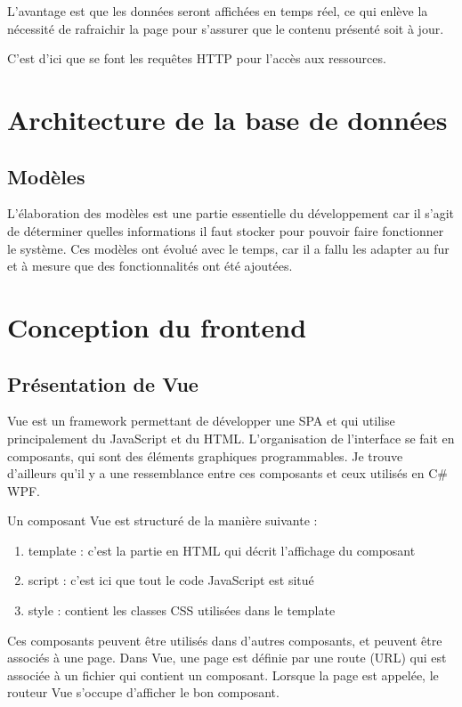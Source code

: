 \documentclass[
    iai, %
    eai, %
]{heig-tb}
\begin{document}
L'avantage est que les données seront affichées en temps réel, ce qui enlève la nécessité de rafraichir la page pour s'assurer que le contenu présenté soit à jour.

C'est d'ici que se font les requêtes HTTP pour l'accès aux ressources.

\chapter{Architecture de la base de données}
\section{Modèles}
L'élaboration des modèles est une partie essentielle du développement car il s'agit de déterminer quelles informations il faut stocker pour pouvoir faire fonctionner le système.
Ces modèles ont évolué avec le temps, car il a fallu les adapter au fur et à mesure que des fonctionnalités ont été ajoutées.

\chapter{Conception du frontend}

\section{Présentation de Vue}
Vue est un framework permettant de développer une SPA et qui utilise principalement du JavaScript et du HTML.
L'organisation de l'interface se fait en composants, qui sont des éléments graphiques programmables.
Je trouve d'ailleurs qu'il y a une ressemblance entre ces composants et ceux utilisés en C\# WPF.

Un composant Vue est structuré de la manière suivante :
\begin{enumerate}
  \item template : c'est la partie en HTML qui décrit l'affichage du composant
  \item script : c'est ici que tout le code JavaScript est situé
  \item style : contient les classes CSS utilisées dans le template
\end{enumerate}
\bigskip
Ces composants peuvent être utilisés dans d'autres composants, et peuvent être associés à une page.
Dans Vue, une page est définie par une route (URL) qui est associée à un fichier qui contient un composant.
Lorsque la page est appelée, le routeur Vue s'occupe d'afficher le bon composant.
\end{document}
